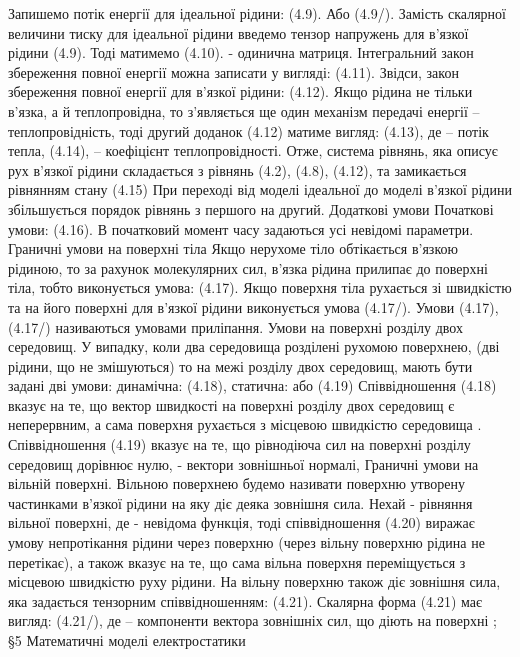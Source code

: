 Запишемо потік енергії для ідеальної рідини:
 						(4.9).
Або 	 						(4.9/). 
Замість скалярної величини тиску   для ідеальної рідини введемо тензор напружень для в'язкої рідини  					(4.9).
Тоді матимемо  			(4.10).
  - одинична матриця. Інтегральний закон збереження повної енергії можна записати у вигляді:
 	(4.11).
Звідси, закон збереження повної енергії для в'язкої рідини: 
 			(4.12).
Якщо рідина не тільки в'язка, а й теплопровідна, то з'являється ще один механізм передачі енергії – теплопровідність, тоді другий доданок (4.12) матиме вигляд:
 							(4.13),
де   – потік тепла,  						(4.14), 
  – коефіцієнт теплопровідності.
Отже, система рівнянь, яка описує рух в'язкої рідини складається з рівнянь (4.2), (4.8), (4.12), та замикається рівнянням стану  			(4.15)
При переході від моделі ідеальної до моделі в'язкої рідини збільшується порядок рівнянь з першого на другий.
Додаткові умови
Початкові умови:  				(4.16).
В початковий момент часу задаються усі невідомі параметри.
Граничні умови на поверхні тіла 
Якщо нерухоме тіло обтікається в'язкою рідиною, то за рахунок молекулярних сил, в'язка рідина прилипає до поверхні тіла, тобто виконується умова: 	  									(4.17). 
Якщо поверхня тіла рухається зі швидкістю   та на його поверхні для в'язкої рідини виконується умова 
 									(4.17/).
Умови (4.17), (4.17/) називаються умовами приліпання.
Умови на поверхні розділу двох середовищ.
У випадку, коли два середовища розділені рухомою поверхнею, (дві рідини, що не змішуються) то на межі розділу двох середовищ, мають бути задані дві умови: 
динамічна:   							(4.18),
статична:   або	 	 		(4.19)
Співвідношення (4.18) вказує на те, що вектор швидкості на поверхні розділу двох середовищ є неперервним, а сама поверхня рухається з місцевою швидкістю середовища  . Співвідношення (4.19) вказує на те, що рівнодіюча сил на поверхні розділу середовищ дорівнює нулю,   - вектори зовнішньої нормалі,  
Граничні умови на вільній поверхні. 
Вільною поверхнею будемо називати поверхню утворену частинками в'язкої рідини на яку діє деяка зовнішня сила. Нехай   - рівняння вільної поверхні, де  - невідома функція, тоді співвідношення 
 									 (4.20) виражає умову непротікання рідини через поверхню (через вільну поверхню рідина не перетікає), а також вказує на те, що сама вільна поверхня переміщується з місцевою швидкістю руху рідини.
На вільну поверхню також діє зовнішня сила, яка задається тензорним співвідношенням:  							(4.21).
Скалярна форма (4.21) має вигляд: 
 						(4.21/),    де   – компоненти вектора зовнішніх сил, що діють на поверхні  ;
§5 Математичні моделі електростатики
